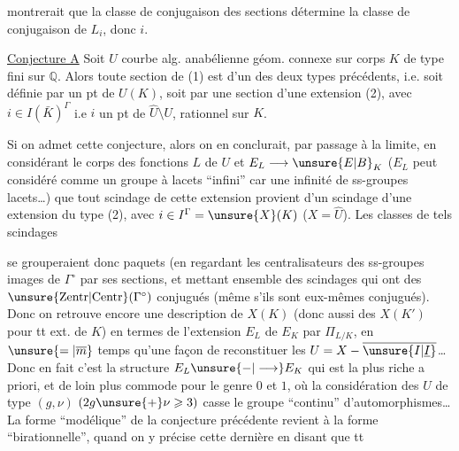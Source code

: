 montrerait que la classe de conjugaison des sections détermine la classe de conjugaison de $L_i$, donc $i$.

\uline{Conjecture A} Soit $U$ courbe alg. anabélienne géom. connexe sur corps $K$ de type fini sur $\mathbb{Q}$. Alors toute section de (1) est  d'un des deux types précédents, i.e. soit définie par un pt de $U(K)$, soit par une section d'une extension (2), avec $i\in I(\bar K)^\Gamma$ i.e $i$ un pt de $\widehat U\setminus U$, rationnel sur $K$.

Si on admet cette conjecture, alors on en conclurait, par passage à la limite, en considérant le corps des fonctions $L$ de $U$ et $E_L\longrightarrow \unsure{E|B}_K$ ($E_L$ peut  considéré comme un groupe à lacets ``infini'' car une infinité de  ss-groupes lacets\ldots) que tout scindage de cette extension provient d'un scindage d'une extension du type (2), avec $i\in I^\Gamma=\unsure{X}(K)$ ($X=\widehat U$). Les classes  de tels scindages

se grouperaient donc   paquets
(en regardant les centralisateurs des ss-groupes
images de $\Gamma^\circ$ par ses sections, et 
mettant ensemble des scindages qui ont des
$\unsure{\mathrm{Zentr}|\mathrm{Centr}}(\Gamma^\circ)$ conjugués (même s'ils  sont
eux-mêmes conjugués). Donc on retrouve
encore une description de $X(K)$ (donc
aussi des $X(K')$ pour tt ext.   de $K$)
en termes de l'extension $E_L$ de $E_K$ par
$\Pi_{L/K}$, en $\unsure{=|\overline m}$ temps qu'une façon de
reconstituer les $U=X-\overline{\unsure{I|\underline I}}$\ldots
Donc en fait c'est la structure $E_L\unsure{-|\longrightarrow}E_K$
qui est la plus riche a priori, et de
loin plus commode pour le genre $0$ et $1$,
où la considération des $U$ de type $(g,\nu)$
$(2g\unsure{+}\nu\geqslant3)$ casse le groupe ``continu''
d'automorphismes\ldots La forme ``modélique''
de la conjecture précédente revient
à la forme ``birationnelle'', quand on y
précise cette dernière en disant que tt

